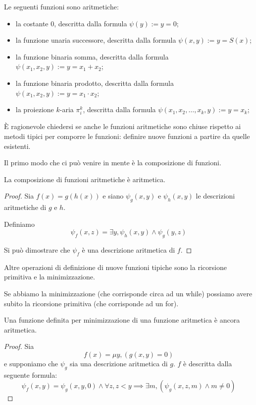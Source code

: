 Le seguenti funzioni sono aritmetiche:
\begin{itemize}
    \item la costante 0, descritta dalla formula $\psi(y) := y = 0$;
    \item la funzione unaria successore, descritta dalla formula $\psi(x,y) := y = S(x)$;
    \item la funzione binaria somma, descritta dalla formula $\psi(x_{1},x_{2},y) := y = x_{1} + x_{2}$;
    \item la funzione binaria prodotto, descritta dalla formula $\psi(x_{1},x_{2},y) := y = x_{1} \cdot x_{2}$;
    \item la proiezione $k$-aria $\pi_{i}^{k}$, descritta dalla formula $\psi(x_{1},x_{2},\dotsc,x_{k},y) :=
    y = x_{k}$;
\end{itemize}

È ragionevole chiedersi se anche le funzioni aritmetiche sono chiuse rispetto ai metodi tipici per
comporre le funzioni: definire nuove funzioni a partire da quelle esistenti.

Il primo modo che ci può venire in mente è la composizione di funzioni.

\begin{lem}
    La composizione di funzioni aritmetiche è aritmetica.
\end{lem}
\begin{proof}
    Sia $f(x) = g(h(x))$ e siano $\psi_{g}(x,y)$ e $\psi_{h}(x,y)$ le descrizioni aritmetiche di $g$
    e $h$.

    Definiamo
    \begin{equation*}
        \psi_{f}(x,z) = \exists y, \psi_{h}(x,y) \land \psi_{g}(y,z)
    \end{equation*}

    Si può dimostrare che $\psi_{f}$ è una descrizione aritmetica di $f$.
\end{proof}

Altre operazioni di definizione di nuove funzioni tipiche sono la ricorsione primitiva e la minimizzazione.

Se abbiamo la minimizzazione (che corrisponde circa ad un while) possiamo avere subito la ricorsione
primitiva (che corrisponde ad un for).

\begin{lem}
    Una funzione definita per minimizzazione di una funzione aritmetica è ancora aritmetica.
\end{lem}
\begin{proof}
    Sia
    \begin{equation*}
        f(x) = \mu y, (g(x,y)=0)
    \end{equation*}
    e supponiamo che $\psi_{g}$ sia una descrizione aritmetica di $g$. $f$ è descritta dalla
    seguente formula:
    \begin{equation*}
        \psi_{f}(x,y) = \psi_{g}(x,y,0) \land \forall z, z < y \implies \exists m, (\psi_{g}(x,z,m)
        \land m \not= 0)
    \end{equation*}
\end{proof}

